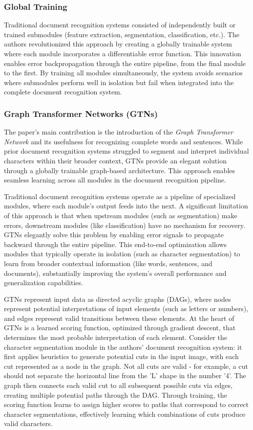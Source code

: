 \documentclass[10pt]{article}
\begin{document}
\subsubsection*{Global Training}
Traditional document recognition systems consisted of independently built or trained submodules (feature extraction, segmentation, classification, etc.). The authors revolutionized this approach by creating a globally trainable system where each module incorporates a differentiable error function. This innovation enables error backpropagation through the entire pipeline, from the final module to the first. By training all modules simultaneously, the system avoids scenarios where submodules perform well in isolation but fail when integrated into the complete document recognition system.

\subsubsection*{Graph Transformer Networks (GTNs)}
The paper's main contribution is the introduction of the \textit{Graph Transformer Network} and its usefulness for recognizing complete words and sentences. While prior document recognition systems struggled to segment and interpret individual characters within their broader context, GTNs provide an elegant solution through a globally trainable graph-based architecture. This approach enables seamless learning across all modules in the document recognition pipeline.

Traditional document recognition systems operate as a pipeline of specialized modules, where each module's output feeds into the next. A significant limitation of this approach is that when upstream modules (such as segmentation) make errors, downstream modules (like classification) have no mechanism for recovery. GTNs elegantly solve this problem by enabling error signals to propagate backward through the entire pipeline. This end-to-end optimization allows modules that typically operate in isolation (such as character segmentation) to learn from broader contextual information (like words, sentences, and documents), substantially improving the system's overall performance and generalization capabilities.

GTNs represent input data as directed acyclic graphs (DAGs), where nodes represent potential interpretations of input elements (such as letters or numbers), and edges represent valid transitions between these elements. At the heart of GTNs is a learned scoring function, optimized through gradient descent, that determines the most probable interpretation of each element. Consider the character segmentation module in the authors' document recognition system: it first applies heuristics to generate potential cuts in the input image, with each cut represented as a node in the graph. Not all cuts are valid - for example, a cut should not separate the horizontal line from the 'L' shape in the number '4'. The graph then connects each valid cut to all subsequent possible cuts via edges, creating multiple potential paths through the DAG. Through training, the scoring function learns to assign higher scores to paths that correspond to correct character segmentations, effectively learning which combinations of cuts produce valid characters.
\end{document}

